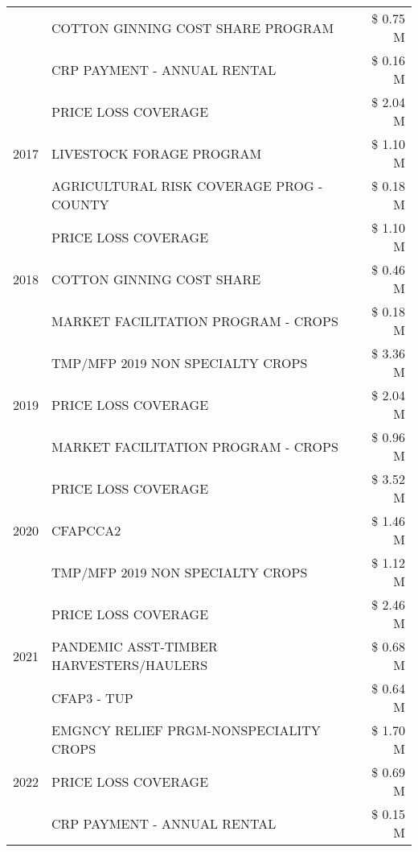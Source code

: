 \begin{tabular}{llr}
 & COTTON GINNING COST SHARE PROGRAM & \$ 0.75 M \\
 & CRP PAYMENT - ANNUAL RENTAL & \$ 0.16 M \\
\cline{1-3}
\multirow[t]{3}{*}{2017} & PRICE LOSS COVERAGE & \$ 2.04 M \\
 & LIVESTOCK FORAGE PROGRAM & \$ 1.10 M \\
 & AGRICULTURAL RISK COVERAGE PROG - COUNTY & \$ 0.18 M \\
\cline{1-3}
\multirow[t]{3}{*}{2018} & PRICE LOSS COVERAGE & \$ 1.10 M \\
 & COTTON GINNING COST SHARE & \$ 0.46 M \\
 & MARKET FACILITATION PROGRAM - CROPS & \$ 0.18 M \\
\cline{1-3}
\multirow[t]{3}{*}{2019} & TMP/MFP 2019 NON SPECIALTY CROPS & \$ 3.36 M \\
 & PRICE LOSS COVERAGE & \$ 2.04 M \\
 & MARKET FACILITATION PROGRAM - CROPS & \$ 0.96 M \\
\cline{1-3}
\multirow[t]{3}{*}{2020} & PRICE LOSS COVERAGE & \$ 3.52 M \\
 & CFAPCCA2 & \$ 1.46 M \\
 & TMP/MFP 2019 NON SPECIALTY CROPS & \$ 1.12 M \\
\cline{1-3}
\multirow[t]{3}{*}{2021} & PRICE LOSS COVERAGE & \$ 2.46 M \\
 & PANDEMIC ASST-TIMBER HARVESTERS/HAULERS & \$ 0.68 M \\
 & CFAP3 - TUP & \$ 0.64 M \\
\cline{1-3}
\multirow[t]{3}{*}{2022} & EMGNCY RELIEF PRGM-NONSPECIALITY CROPS & \$ 1.70 M \\
 & PRICE LOSS COVERAGE & \$ 0.69 M \\
 & CRP PAYMENT - ANNUAL RENTAL & \$ 0.15 M \\
\cline{1-3}
\bottomrule
\end{tabular}
